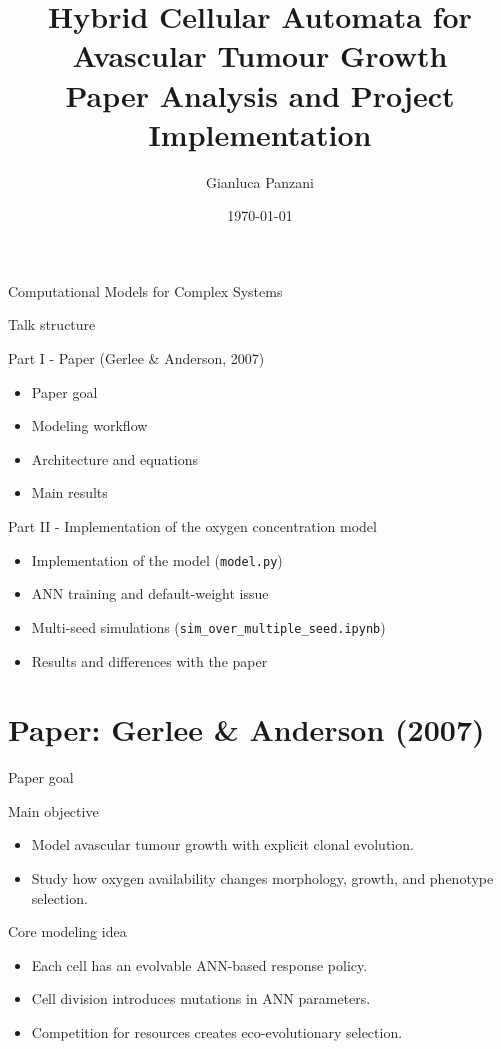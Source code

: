 \documentclass[10pt,aspectratio=169]{beamer}
\title[Hybrid CA: Paper + Implementation]{Hybrid Cellular Automata for Avascular Tumour Growth\\Paper Analysis and Project Implementation}
\author{Gianluca Panzani}
\institute{University of Pisa - Computer Science AI}
\date{\today}
\begin{document}
\begin{frame}
  \titlepage
  \vspace{-0.4em}
  \begin{center}
    {\large Computational Models for Complex Systems}
  \end{center}
\end{frame}

\begin{frame}[c]{Talk structure}
\normalsize
\begin{block}{Part I - Paper (Gerlee \& Anderson, 2007)}
\begin{itemize}
  \item Paper goal
  \item Modeling workflow
  \item Architecture and equations
  \item Main results
\end{itemize}
\end{block}

\begin{block}{Part II - Implementation of the oxygen concentration model}
\begin{itemize}
  \item Implementation of the model (\texttt{model.py})
  \item ANN training and default-weight issue
  \item Multi-seed simulations (\texttt{sim\_over\_multiple\_seed.ipynb})
  \item Results and differences with the paper
\end{itemize}
\end{block}
\end{frame}

\section{Paper: Gerlee \& Anderson (2007)}

\begin{frame}[c]{Paper goal}
\begin{block}{Main objective}
\begin{itemize}
  \item Model avascular tumour growth with explicit clonal evolution.
  \item Study how oxygen availability changes morphology, growth, and phenotype selection.
\end{itemize}
\end{block}
\begin{block}{Core modeling idea}
\begin{itemize}
  \item Each cell has an evolvable ANN-based response policy.
  \item Cell division introduces mutations in ANN parameters.
  \item Competition for resources creates eco-evolutionary selection.
\end{itemize}
\end{block}
\end{frame}
\end{document}
